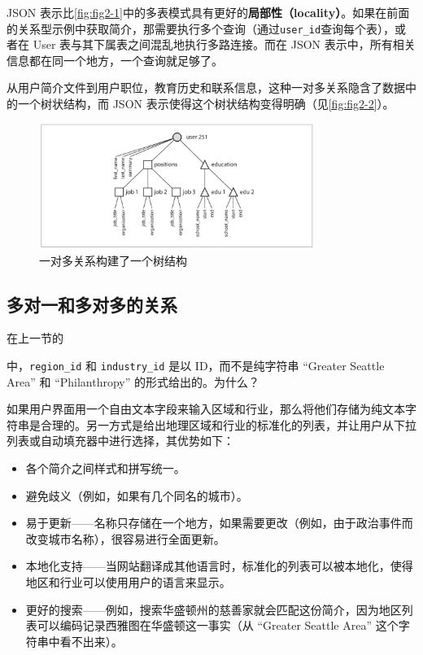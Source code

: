 JSON 表示比\autoref{fig:fig2-1}中的多表模式具有更好的\textbf{局部性（locality）}。如果在前面的关系型示例中获取简介，那需要执行多个查询（通过\texttt{user\_id}查询每个表），或者在 User 表与其下属表之间混乱地执行多路连接。而在 JSON 表示中，所有相关信息都在同一个地方，一个查询就足够了。

从用户简介文件到用户职位，教育历史和联系信息，这种一对多关系隐含了数据中的一个树状结构，而 JSON 表示使得这个树状结构变得明确（见\autoref{fig:fig2-2}）。

\begin{figure}[htb]
    \includegraphics[width=0.8\textwidth]{img/fig2-2.png}
    \caption{一对多关系构建了一个树结构}
    \label{fig:fig2-2}
\end{figure}

\subsection{多对一和多对多的关系}

在上一节的\author{exa:example2-1}中，\texttt{region\_id} 和 \texttt{industry\_id} 是以 ID，而不是纯字符串 “Greater Seattle Area” 和 “Philanthropy” 的形式给出的。为什么？

如果用户界面用一个自由文本字段来输入区域和行业，那么将他们存储为纯文本字符串是合理的。另一方式是给出地理区域和行业的标准化的列表，并让用户从下拉列表或自动填充器中进行选择，其优势如下：

\begin{itemize}
    \item 各个简介之间样式和拼写统一。
    \item 避免歧义（例如，如果有几个同名的城市）。
    \item 易于更新——名称只存储在一个地方，如果需要更改（例如，由于政治事件而改变城市名称），很容易进行全面更新。
    \item 本地化支持——当网站翻译成其他语言时，标准化的列表可以被本地化，使得地区和行业可以使用用户的语言来显示。
    \item 更好的搜索——例如，搜索华盛顿州的慈善家就会匹配这份简介，因为地区列表可以编码记录西雅图在华盛顿这一事实（从 “Greater Seattle Area” 这个字符串中看不出来）。
\end{itemize}

